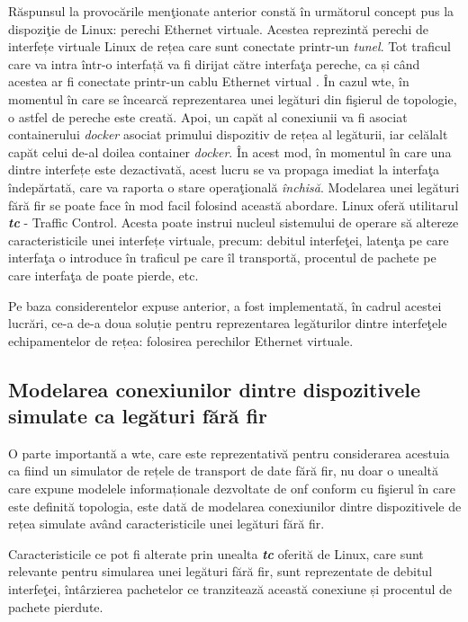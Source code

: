 Răspunsul la provocările menţionate anterior constă în următorul concept pus la dispoziţie de Linux: perechi Ethernet virtuale. Acestea reprezintă perechi de interfețe virtuale Linux de rețea care sunt conectate printr-un \textit{tunel}. Tot traficul care va intra într-o interfață va fi dirijat către interfaţa pereche, ca și când acestea ar fi conectate printr-un cablu Ethernet virtual \cite{linuxnetworking2016}. În cazul \gls{wte}, în momentul în care se încearcă reprezentarea unei legături din fişierul de topologie, o astfel de pereche este creată. Apoi, un capăt al conexiunii va fi asociat containerului \textit{docker} asociat primului dispozitiv de rețea al legăturii, iar celălalt capăt celui de-al doilea container \textit{docker}. În acest mod, în momentul în care una dintre interfețe este dezactivată, acest lucru se va propaga imediat la interfaţa îndepărtată, care va raporta o stare operaţională \textit{închisă}. Modelarea unei legături fără fir se poate face în mod facil folosind această abordare. Linux oferă utilitarul \textit{\textbf{tc}} - Traffic Control. Acesta poate instrui nucleul sistemului de operare să altereze caracteristicile unei interfețe virtuale, precum: debitul interfeţei, latenţa pe care interfaţa o introduce în traficul pe care îl transportă, procentul de pachete pe care interfaţa de poate pierde, etc.

Pe baza considerentelor expuse anterior, a fost implementată, în cadrul acestei lucrări, ce-a de-a doua soluție pentru reprezentarea legăturilor dintre interfeţele echipamentelor de rețea: folosirea perechilor Ethernet virtuale.

\subsection{Modelarea conexiunilor dintre dispozitivele simulate ca legături fără fir}

O parte importantă a \gls{wte}, care este reprezentativă pentru considerarea acestuia ca fiind un simulator de rețele de transport de date fără fir, nu doar o unealtă care expune modelele informaționale dezvoltate de \gls{onf} conform cu fişierul în care este definită topologia, este dată de modelarea conexiunilor dintre dispozitivele de rețea simulate având caracteristicile unei legături fără fir.

Caracteristicile ce pot fi alterate prin unealta \textit{\textbf{tc}} oferită de Linux, care sunt relevante pentru simularea unei legături fără fir, sunt reprezentate de debitul interfeţei, întârzierea pachetelor ce tranzitează această conexiune și procentul de pachete pierdute.

